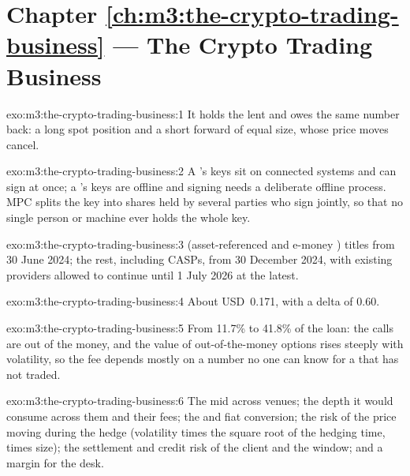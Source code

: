 \section*{Chapter \ref{ch:m3:the-crypto-trading-business} --- The Crypto Trading Business}

\begin{solution}{exo:m3:the-crypto-trading-business:1}
It holds the lent  and owes the same number back: a long spot position and a short forward of equal size, whose price
moves cancel.
\end{solution}

\begin{solution}{exo:m3:the-crypto-trading-business:2}
A 's keys sit on connected systems and can sign at once; a 's keys are offline and signing needs a
deliberate offline process. MPC splits the key into shares held by several parties who sign jointly, so that no single person
or machine ever holds the whole key.
\end{solution}

\begin{solution}{exo:m3:the-crypto-trading-business:3}
 (asset-referenced and e-money ) titles from 30 June 2024; the rest, including CASPs, from 30 December 2024, with
existing providers allowed to continue until 1 July 2026 at the latest.
\end{solution}

\begin{solution}{exo:m3:the-crypto-trading-business:4}
About USD~0.171, with a delta of 0.60.
\end{solution}

\begin{solution}{exo:m3:the-crypto-trading-business:5}
From 11.7\% to 41.8\% of the loan: the calls are out of the money, and the value of out-of-the-money options rises steeply with
volatility, so the fee depends mostly on a number no one can know for a  that has not traded.
\end{solution}

\begin{solution}{exo:m3:the-crypto-trading-business:6}
The mid across venues; the depth it would consume across them and their fees; the  and fiat conversion; the risk of the price
moving during the hedge (volatility times the square root of the hedging time, times size); the settlement and credit risk of the client
and the window; and a margin for the desk.
\end{solution}


